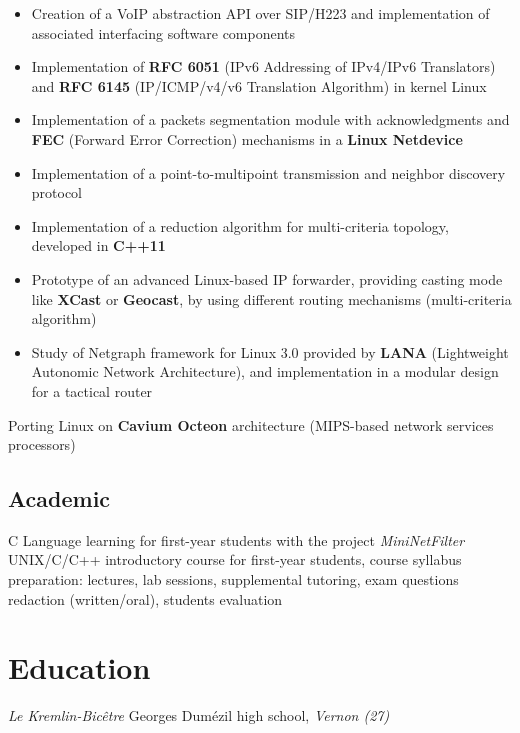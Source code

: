 \documentclass[11pt, a4paper]{moderncv}
\begin{document}
\vspace{1em}
{
  \begin{itemize}
    \renewcommand{\labelitemi}{$\bullet$  }
    \item Creation of a VoIP abstraction API over SIP/H223 and implementation of associated interfacing software
      components
    \item Implementation of \textbf{RFC 6051} (IPv6 Addressing of IPv4/IPv6 Translators) and \textbf{RFC 6145} (IP/ICMP/v4/v6
      Translation Algorithm) in kernel Linux
    \item Implementation of a packets segmentation module with acknowledgments and \textbf{FEC} (Forward Error Correction)
      mechanisms in a \textbf{Linux Netdevice}
    \item Implementation of a point-to-multipoint transmission and neighbor discovery protocol
    \item Implementation of a reduction algorithm for multi-criteria topology, developed in \textbf{C++11}
    \item Prototype of an advanced Linux-based IP forwarder, providing casting mode like \textbf{XCast} or \textbf{Geocast},
      by using different routing mechanisms (multi-criteria algorithm)
    \item Study of Netgraph framework for Linux 3.0 provided by \textbf{LANA} (Lightweight Autonomic Network Architecture),
      and implementation in a modular design for a tactical router
  \end{itemize}
}
{
	Porting Linux on \textbf{Cavium Octeon} architecture (MIPS-based network services processors)
}

\subsection{Academic}
		{C Language learning for first-year students with the project \textit{MiniNetFilter}}
		{UNIX/C/C++ introductory course for first-year students, course syllabus preparation: lectures, lab sessions,
			supplemental tutoring, exam questions redaction (written/oral), students evaluation}

\section{Education}
			{\textit{Le Kremlin-Bic\^etre}}{}{}
			{Georges Dumézil high school, \textit{Vernon (27)}}{}{}
\end{document}
